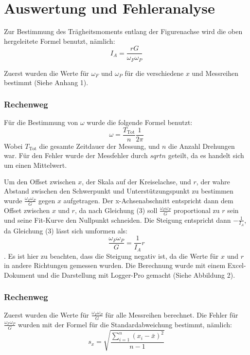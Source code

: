 \documentclass[11pt,a4paper]{article} %
\begin{document}
\section{Auswertung und Fehleranalyse}
Zur Bestimmung des Trägheitsmoments entlang der Figurenachse wird die oben hergeleitete Formel benutzt, nämlich:
$$I_A = \frac{rG}{\omega_F \omega_P}$$

Zuerst wurden die Werte für $\omega_F$ und $\omega_P$ für die verschiedene $x$ und Messreihen bestimmt (Siehe Anhang 1). 
\begin{tcolorbox}[colback=white]
\subsubsection{Rechenweg}
Für die Bestimmung von $\omega$ wurde die folgende Formel benutzt:
$$ \omega = \frac{T_\textrm{Tot}}{n}\frac{1}{2\pi}$$
Wobei $T_\textrm{Tot}$ die gesamte Zeitdauer der Messung, und $n$ die Anzahl Drehungen war.
Für den Fehler wurde der Messfehler durch $sqrt{n}$ geteilt, da es handelt sich um einen Mittelwert.
\end{tcolorbox}

Um den Offset zwischen $x$, der Skala auf der Kreiselachse, und $r$, der wahre Abstand zwischen den Schwerpunkt und Unterstützungspunkt zu bestimmen wurde $\frac{\omega_F\omega_P}{G}$ gegen $x$ aufgetragen. Der x-Achsenabschnitt entspricht dann dem Offset zwischen $x$ und $r$, da nach Gleichung (3) soll $\frac{\omega_F\omega_P}{G}$ proportional zu $r$ sein und seine Fit-Kurve den Nullpunkt schneiden. Die Steigung entspricht dann $-\frac{1}{I_A}$, da Gleichung (3) lässt sich umformen als:
$$ \frac{\omega_F\omega_P}{G}  = \frac{1}{I_A} r$$. Es ist hier zu beachten, dass die Steigung negativ ist, da die Werte für $x$ und $r$ in andere Richtungen gemessen wurden. Die Berechnung wurde mit einem Excel-Dokument und die Darstellung mit Logger-Pro gemacht (Siehe Abbildung 2).


\begin{tcolorbox}[colback=white] 
\subsubsection{Rechenweg}
Zuerst wurden die Werte für $\frac{\omega_F\omega_P}{G}$ für alle Messreihen berechnet. Die Fehler für $\frac{\omega_F\omega_P}{G}$ wurden mit der Formel für die Standardabweichung bestimmt, nämlich:
$$s_x = \sqrt{\frac{\sum_{i=1}^{n}(x_i-\bar{x})^2}{n-1}} $$
\end{tcolorbox}
\end{document}
